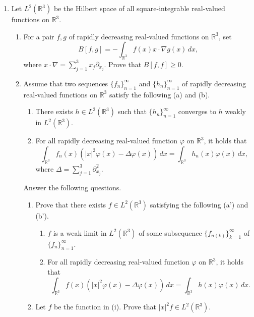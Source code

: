 \documentclass{article}
\begin{document}
\begin{enumerate}[label=\fbox{\arabic*}]
  \item Let $L^2(\mathbb{R}^3)$ be the Hilbert space of all square-integrable real-valued functions on $\mathbb{R}^3$.
        \begin{enumerate}[label=(\arabic*)]
          \item For a pair $f, g$ of rapidly decreasing real-valued functions on $\mathbb{R}^3$, set
                \[
                  B[f, g] = - \int_{\mathbb{R}^3} f(x) x \cdot \nabla g(x) \, dx,
                \]
                where $x \cdot \nabla = \sum_{j=1}^3 x_j \partial_{x_j}$. Prove that $B[f, f] \ge 0$.
          \item Assume that two sequences $\{f_n\}_{n=1}^\infty$ and $\{h_n\}_{n=1}^\infty$ of rapidly decreasing real-valued functions on $\mathbb{R}^3$ satisfy the following (a) and (b).
                \begin{enumerate}[label=(\alph*)]
                  \item There exists $h \in L^2(\mathbb{R}^3)$ such that $\{h_n\}_{n=1}^\infty$ converges to $h$ weakly in $L^2(\mathbb{R}^3)$.
                  \item For all rapidly decreasing real-valued function $\varphi$ on $\mathbb{R}^3$, it holds that
                        \[
                          \int_{\mathbb{R}^3} f_n(x) (|x|^2 \varphi(x) - \Delta \varphi(x)) \, dx = \int_{\mathbb{R}^3} h_n(x) \varphi(x) \, dx,
                        \]
                        where $\Delta = \sum_{j=1}^3 \partial_{x_j}^2$.
                \end{enumerate}
                Answer the following questions.
                \begin{enumerate}[label=(\roman*)]
                  \item Prove that there exists $f \in L^2(\mathbb{R}^3)$ satisfying the following (a') and (b').
                        \begin{enumerate}[label=(a')]
                          \item $f$ is a weak limit in $L^2(\mathbb{R}^3)$ of some subsequence $\{f_{n(k)}\}_{k=1}^\infty$ of $\{f_n\}_{n=1}^\infty$.
                          \item[(b')] For all rapidly decreasing real-valued function $\varphi$ on $\mathbb{R}^3$, it holds that
                                \[
                                  \int_{\mathbb{R}^3} f(x) (|x|^2 \varphi(x) - \Delta \varphi(x)) \, dx = \int_{\mathbb{R}^3} h(x) \varphi(x) \, dx.
                                \]
                        \end{enumerate}
                  \item Let $f$ be the function in (i). Prove that $|x|^2 f \in L^2(\mathbb{R}^3)$.
                \end{enumerate}
        \end{enumerate}


\end{enumerate}
\end{document}
